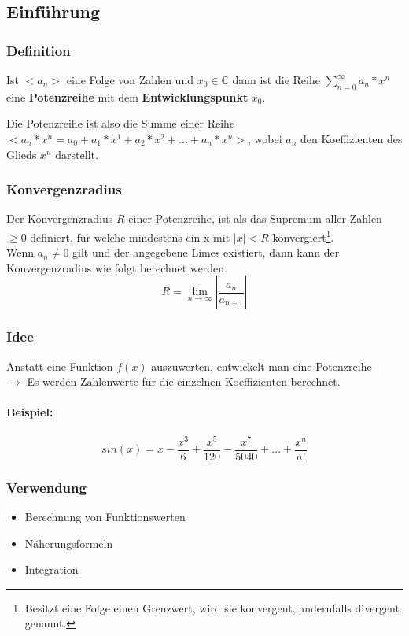 \documentclass{school}
\begin{document}
\subsection{Einführung}
\subsubsection{Definition}
\begin{flushleft}
Ist $<a_n>$ eine Folge von Zahlen und $x_0 \in \mathbb{C}$ dann ist die Reihe $\sum_{n=0}^\infty a_n*x^n$ eine \textbf{Potenzreihe} mit dem \textbf{Entwicklungspunkt} $x_0$.
\end{flushleft}
Die Potenzreihe ist also die Summe einer Reihe $<a_n * x^n = a_0 + a_1 * x^1 + a_2 * x^2 + ... + a_n * x^n>$, wobei $a_n$ den Koeffizienten des Glieds $x^n$ darstellt.

\subsubsection{Konvergenzradius}
Der Konvergenzradius $R$ einer Potenzreihe, ist als das Supremum aller Zahlen $\geq 0$ definiert, für welche mindestens ein x mit $|x| < R$ konvergiert\footnote{Besitzt eine Folge einen Grenzwert, wird sie konvergent, andernfalls divergent genannt.}.
\vspace{1 em}\\
Wenn $a_{n} \neq 0$ gilt und der angegebene Limes existiert, dann kann der Konvergenzradius wie folgt berechnet werden.
$$R = \lim\limits_{n \to \infty} |\frac{a_n}{a_{n+1}}|$$

\subsubsection{Idee}
Anstatt eine Funktion $f(x)$ auszuwerten, entwickelt man eine Potenzreihe\\
$\to$ Es werden Zahlenwerte für die einzelnen Koeffizienten berechnet.
\paragraph{Beispiel:} $$sin(x) = x - \frac{x^3}{6} + \frac{x^5}{120} - \frac{x^7}{5040} \pm ... \pm \frac{x^n}{n!}$$

\subsubsection{Verwendung}
\begin{itemize}
 \item Berechnung von Funktionswerten
 \item N\"aherungsformeln
 \item Integration
\end{itemize}
\end{document}

